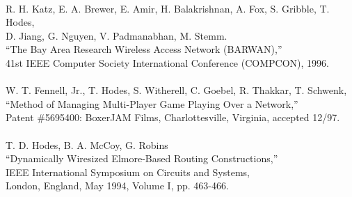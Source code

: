 \begin{tabbing}
\smallskip \\[-3pt]
\>    R. H. Katz, E. A. Brewer, E. Amir, H. Balakrishnan, A. Fox,
       S. Gribble, T. Hodes, \\
\>\>\>   D. Jiang, G. Nguyen, V. Padmanabhan, M. Stemm. \\
\>\> ``The Bay Area Research Wireless Access Network (BARWAN),''  \\
\>\> 41st IEEE Computer Society International Conference (COMPCON), 1996. \\
\smallskip \\
\>	W. T. Fennell, Jr., T. Hodes, S. Witherell, C. Goebel, 
	R. Thakkar, T. Schwenk, \\
\>\>	``Method of Managing Multi-Player Game Playing Over a Network,''  \\
\>\>	Patent \#5695400: BoxerJAM Films, Charlottesville, Virginia, accepted 12/97.  \\
\smallskip \\
\>    T. D. Hodes, B. A. McCoy, G. Robins \\
\>\>  ``Dynamically Wiresized Elmore-Based Routing Constructions,''  \\
\> IEEE International Symposium on Circuits and Systems, \\
\>\>   London, England, May 1994, Volume I, pp. 463-466. \\
\end{tabbing}








